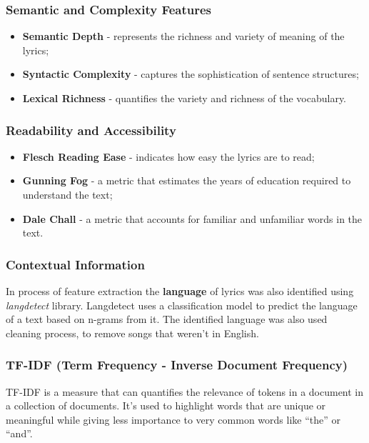 \subsubsection*{Semantic and Complexity Features}
\begin{itemize}
  \item \textbf{Semantic Depth} - represents the richness and variety of
    meaning of the lyrics;
  \item \textbf{Syntactic Complexity} - captures the sophistication of
    sentence structures;
  \item \textbf{Lexical Richness} - quantifies the variety and richness of the
    vocabulary.
\end{itemize}



\subsubsection*{Readability and Accessibility}
\begin{itemize}
  \item \textbf{Flesch Reading Ease} - indicates how easy the lyrics are to
    read;
  \item \textbf{Gunning Fog} - a metric that estimates the  years of education
    required to understand the text;
  \item \textbf{Dale Chall} - a metric that accounts for familiar and
    unfamiliar words in the text.
\end{itemize}


\subsubsection*{Contextual Information}
  In process of feature extraction the \textbf{language} of lyrics was also
  identified using \textit{langdetect} library. Langdetect uses a
  classification model to predict the language of a text based on n-grams from
  it. The identified language was also used cleaning process, to remove songs
  that weren't in English.

\subsubsection*{TF-IDF (Term Frequency - Inverse Document Frequency)}

TF-IDF is a measure that can quantifies the relevance of tokens in a
document in a collection of documents. It's used to highlight words that are unique or
meaningful while giving less importance to very common words like ``the'' or
``and''. \cite{tfidf}

